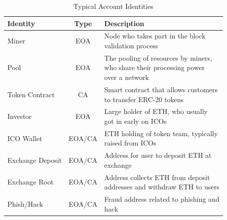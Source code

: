 \begin{table}[t]
\caption{Typical Account Identities}
\begin{center}
\begin{tabular}{|l|c|l|}
\hline
\textbf{Identity} & \textbf{Type}& \textbf{Description} \\
\hline
Miner & EOA & \tabincell{l}{Node who takes part in the block \\validation process} \\ \hline
Pool & EOA & \tabincell{l}{The pooling of resources by miners, \\who share their processing power \\over a network}\\ \hline
Token Contract & CA & \tabincell{l}{Smart contract that allows customers \\to transfer ERC-20 tokens} \\ \hline
Investor & EOA & \tabincell{l}{Large holder of ETH, who usually \\got in early on ICOs} \\ \hline
ICO Wallet & EOA/CA & \tabincell{l}{ETH holding of token team, typically \\raised from ICOs} \\ \hline
Exchange Deposit & EOA/CA & \tabincell{l}{Address for user to deposit ETH at \\exchange} \\ \hline
Exchange Root & EOA/CA & \tabincell{l}{Address collects ETH from deposit \\addresses and withdraw ETH to users} \\ \hline
Phish/Hack & EOA/CA & \tabincell{l}{Fraud address related to phishing and \\hack} \\ \hline
\end{tabular}
\label{table:identity}
\end{center}
\end{table}





